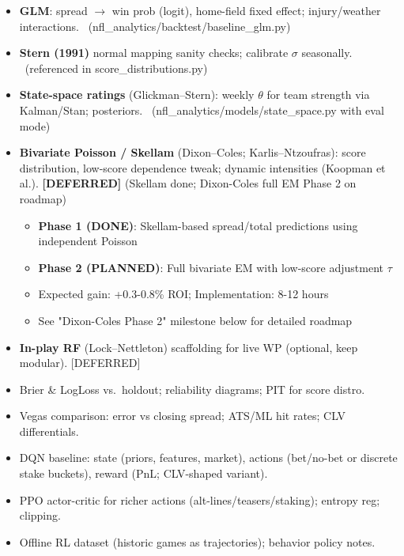 \begin{itemize}
  \item {} \textbf{GLM}: spread $\to$ win prob (logit), home-field fixed effect; injury/weather interactions. \done\ (nfl\_analytics/backtest/baseline\_glm.py)
  \item {} \textbf{Stern (1991)} normal mapping sanity checks; calibrate $\sigma$ seasonally. \done\ (referenced in score\_distributions.py)
  \item {} \textbf{State-space ratings} (Glickman--Stern): weekly $\theta$ for team strength via Kalman/Stan; posteriors. \done\ (nfl\_analytics/models/state\_space.py with eval mode)
  \item {} \textbf{Bivariate Poisson / Skellam} (Dixon--Coles; Karlis--Ntzoufras): score distribution, low-score dependence tweak; dynamic intensities (Koopman et al.). \textbf{[DEFERRED]} (Skellam done; Dixon-Coles full EM Phase 2 on roadmap)
  \begin{itemize}
    \item \textbf{Phase 1 (DONE)}: Skellam-based spread/total predictions using independent Poisson
    \item \textbf{Phase 2 (PLANNED)}: Full bivariate EM with low-score adjustment $\tau$
    \item Expected gain: +0.3-0.8\% ROI; Implementation: 8-12 hours
    \item See "Dixon-Coles Phase 2" milestone below for detailed roadmap
  \end{itemize}
  \item {} \textbf{In-play RF} (Lock--Nettleton) scaffolding for live WP (optional, keep modular). [DEFERRED]
\end{itemize}

\begin{itemize}
  \item {} Brier \& LogLoss vs.\ holdout; reliability diagrams; PIT for score distro.
  \item {} Vegas comparison: error vs closing spread; ATS/ML hit rates; CLV differentials.
\end{itemize}

\begin{itemize}
  \item {} DQN baseline: state (priors, features, market), actions (bet/no-bet or discrete stake buckets), reward (PnL; CLV-shaped variant).
  \item {} PPO actor-critic for richer actions (alt-lines/teasers/staking); entropy reg; clipping.
  \item {} Offline RL dataset (historic games as trajectories); behavior policy notes.
\end{itemize}

